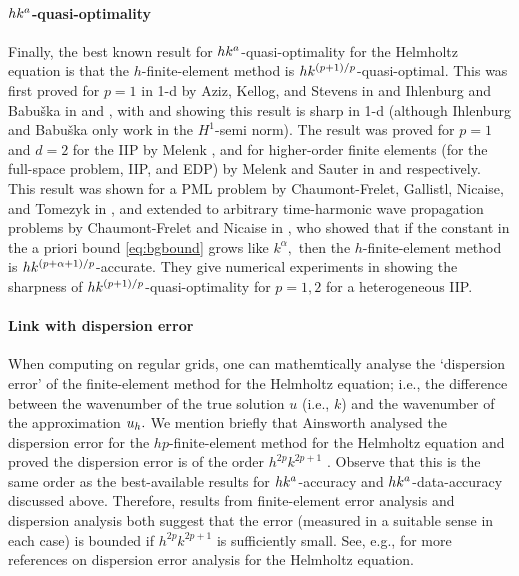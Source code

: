 \paragraph{$hk^{a}$-quasi-optimality} Finally, the best known result for $hk^{a}$-quasi-optimality for the Helmholtz equation is that the $h$-finite-element method is $hk^{(p+1)/p}$-quasi-optimal. This was first proved for $p=1$ in 1-d by Aziz, Kellog, and Stevens in \cite[Theorem 3.1]{AzKeSt:88} and Ihlenburg and Babu\v{s}ka in \cite[Theorem 3]{IhBa:95a} and \cite[Theorems 4.9 and 4.13]{Ih:98}, with \cite[Figures 7-9]{IhBa:95a} and \cite[Section 4.5.4 and Figures 4.11-4.12]{Ih:98} showing this result is sharp in 1-d (although Ihlenburg and Babu\v{s}ka only work in the $H^1$-semi norm). The result was proved for $p=1$ and $d=2$ for the IIP by Melenk \cite[Proposition 8.2.7]{Me:95}, and for higher-order finite elements (for the full-space problem, IIP, and EDP) by Melenk and Sauter in \cite[Corollary 5.6]{MeSa:10} and \cite[Theorem 5.8]{MeSa:11} respectively. This result was shown for a PML problem by Chaumont-Frelet, Gallistl, Nicaise, and Tomezyk in \cite[Theorem 5.1]{ChGaNiTo:18}, and extended to arbitrary time-harmonic wave propagation problems by Chaumont-Frelet and Nicaise in \cite[Theorem 2.15]{ChNi:19}, who showed that if the constant in the a priori bound \cref{eq:bgbound} grows like $k^\alpha,$ then the $h$-finite-element method is $hk^{(p+\alpha+1)/p}$-accurate. They give numerical experiments in \cite[Figure 8]{ChNi:19} showing the sharpness of $hk^{(p+1)/p}$-quasi-optimality for $p=1, 2$ for a heterogeneous IIP.

\paragraph{Link with dispersion error} When computing on regular grids, one can mathemtically analyse the `dispersion error' of the finite-element method for the Helmholtz equation; i.e., the difference between the wavenumber of the true solution $u$ (i.e., $k$) and the wavenumber of the approximation $u_{h}.$ We mention briefly that Ainsworth  analysed the dispersion error for the $hp$-finite-element method for the Helmholtz equation and proved the dispersion error is of the order $h^{2p}k^{2p+1}$ \cite[Equation (3.5)]{Ai:04}. Observe that this is the same order as the best-available results for $hk^{a}$-accuracy and $hk^{a}$-data-accuracy discussed above. Therefore, results from finite-element error analysis and dispersion analysis both suggest that the error (measured in a suitable sense in each case) is bounded if $h^{2p}k^{2p+1}$ is sufficiently small. See, e.g., \cite[Remark 5.3(a)]{DuWu:15} for more references on dispersion error analysis for the Helmholtz equation.

